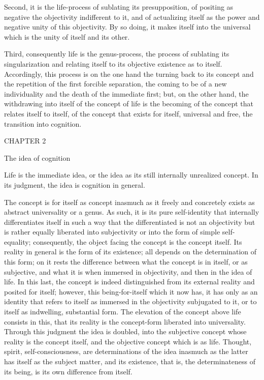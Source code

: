 Second, it is the life-process of sublating its presupposition, of positing
as negative the objectivity indifferent to it, and of actualizing itself as the
power and negative unity of this objectivity. By so doing, it makes itself
into the universal which is the unity of itself and its other.

Third, consequently life is the genus-process, the process of sublating
its singularization and relating itself to its objective existence as to itself.
Accordingly, this process is on the one hand the turning back to its concept
and the repetition of the first forcible separation, the coming to be of a
new individuality and the death of the immediate first; but, on the other
hand, the withdrawing into itself of the concept of life is the becoming of
the concept that relates itself to itself, of the concept that exists for itself,
universal and free, the transition into cognition.

CHAPTER 2

The idea of cognition

Life is the immediate idea, or the idea as its still internally unrealized
concept. In its judgment, the idea is cognition in general.

The concept is for itself as concept inasmuch as it freely and concretely
exists as abstract universality or a genus. As such, it is its pure self-identity
that internally differentiates itself in such a way that the differentiated is
not an objectivity but is rather equally liberated into subjectivity or into the
form of simple self-equality; consequently, the object facing the concept is
the concept itself. Its reality in general is the form of its existence; all depends
on the determination of this form; on it rests the difference between what
the concept is in itself, or as subjective, and what it is when immersed in
objectivity, and then in the idea of life. In this last, the concept is indeed
distinguished from its external reality and posited for itself; however, this
being-for-itself which it now has, it has only as an identity that refers to itself
as immersed in the objectivity subjugated to it, or to itself as indwelling,
substantial form. The elevation of the concept above life consists in this,
that its reality is the concept-form liberated into universality. Through this
judgment the idea is doubled, into the subjective concept whose reality is
the concept itself, and the objective concept which is as life.
 Thought,
spirit, self-consciousness, are determinations of the idea inasmuch as the latter
has itself as the subject matter, and its existence, that is, the determinateness
of its being, is its own difference from itself.

